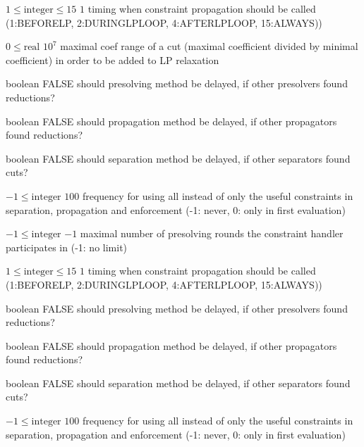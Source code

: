 %
{$1\leq\textrm{integer}\leq15$}%
{$1$}%
{timing when constraint propagation should be called (1:BEFORELP, 2:DURINGLPLOOP, 4:AFTERLPLOOP, 15:ALWAYS))}%
{}

%
{$0\leq\textrm{real}$}%
{$10^{  7}$}%
{maximal coef range of a cut (maximal coefficient divided by minimal coefficient) in order to be added to LP relaxation}%
{}

%
{boolean}%
{FALSE}%
{should presolving method be delayed, if other presolvers found reductions?}%
{}

%
{boolean}%
{FALSE}%
{should propagation method be delayed, if other propagators found reductions?}%
{}

%
{boolean}%
{FALSE}%
{should separation method be delayed, if other separators found cuts?}%
{}

%
{$-1\leq\textrm{integer}$}%
{$100$}%
{frequency for using all instead of only the useful constraints in separation, propagation and enforcement (-1: never, 0: only in first evaluation)}%
{}

%
{$-1\leq\textrm{integer}$}%
{$-1$}%
{maximal number of presolving rounds the constraint handler participates in (-1: no limit)}%
{}

%
{$1\leq\textrm{integer}\leq15$}%
{$1$}%
{timing when constraint propagation should be called (1:BEFORELP, 2:DURINGLPLOOP, 4:AFTERLPLOOP, 15:ALWAYS))}%
{}

%
{boolean}%
{FALSE}%
{should presolving method be delayed, if other presolvers found reductions?}%
{}

%
{boolean}%
{FALSE}%
{should propagation method be delayed, if other propagators found reductions?}%
{}

%
{boolean}%
{FALSE}%
{should separation method be delayed, if other separators found cuts?}%
{}

%
{$-1\leq\textrm{integer}$}%
{$100$}%
{frequency for using all instead of only the useful constraints in separation, propagation and enforcement (-1: never, 0: only in first evaluation)}%
{}

